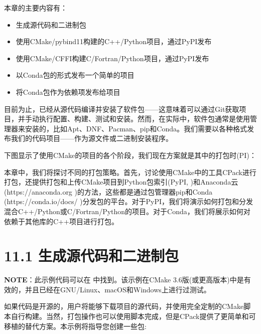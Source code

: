 本章的主要内容有：

\begin{itemize}
\item 生成源代码和二进制包

\item 使用CMake/pybind11构建的C++/Python项目，通过PyPI发布

\item 使用CMake/CFFI构建C/Fortran/Python项目，通过PyPI发布

\item 以Conda包的形式发布一个简单的项目

\item 将Conda包作为依赖项发布给项目

\end{itemize}

目前为止，已经从源代码编译并安装了软件包——这意味着可以通过Git获取项目，并手动执行配置、构建、测试和安装。然而，在实际中，软件包通常是使用管理器来安装的，比如Apt、DNF、Pacman、pip和Conda。我们需要以各种格式发布我们的代码项目——作为源文件或二进制安装程序。

下图显示了使用CMake的项目的各个阶段，我们现在方案就是其中的打包时(PI)：


本章中，我们将探讨不同的打包策略。首先，讨论使用CMake中的工具CPack进行打包，还提供打包和上传CMake项目到Python包索引(PyPI, )和Anaconda云(https://anaconda.org )的方法，这些都是通过包管理器pip和Conda (https://conda.io/docs/ )分发包的平台。对于PyPI，我们将演示如何打包和分发混合C++/Python或C/Fortran/Python的项目。对于Conda，我们将展示如何对依赖于其他库的C++项目进行打包。


\section{11.1 生成源代码和二进制包}

\begin{myInfoBox}
\textbf{NOTE}：此示例代码可以在  中找到。该示例在CMake 3.6版(或更高版本)中是有效的，并且已经在GNU/Linux、macOS和Windows上进行过测试。
\end{myInfoBox}

如果代码是开源的，用户将能够下载项目的源代码，并使用完全定制的CMake脚本自行构建。当然，打包操作也可以使用脚本完成，但是CPack提供了更简单和可移植的替代方案。本示例将指导您创建一些包:

